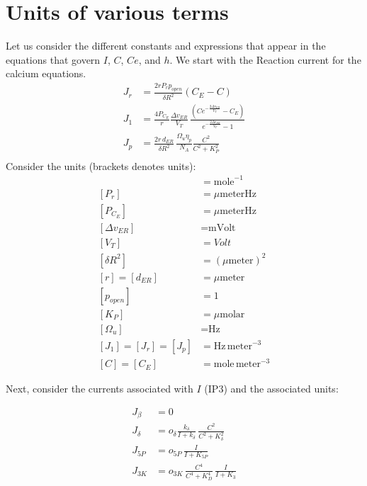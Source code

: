 \documentclass{article}
\begin{document}
\section{Units of various terms}
Let us consider the different constants and expressions that appear in the equations that govern $I$, $C$, $Ce$, and $h$. 
We start with the Reaction current for the calcium equations. 
\newpage
\def\dvER{\Delta{v}_{ER}}
\def\dER{d_{ER}}
\def\dRtwo{\delta R^2}
\def\VVT{{V_T}}
\def\meter{\text{meter}}
\def\Hz{\text{Hz}}
\def\molar{\text{molar}}
\def\mole{\text{mole}}
\begin{align}
J_r &= \frac{2 r P_r p_{open}}{\dRtwo}   (C_E-C)  \\ %
J_1 &= \frac{4 P_{C_E}}{r}\frac{\dvER}{\VVT} \, \frac{(C e^{- \frac{2\dvER}{\VVT}} - C_E)}{e^{-\frac{2\dvER}{\VVT}}-1} \\ %
J_p &= \frac{2 r\, d_{ER}}{\dRtwo}  \,\frac{\Omega_u\eta_p}{N_A}   \frac{C^2}{C^2 + K_P^2} \\ %
\end{align}
Consider the units (brackets denotes units): 
\begin{align}
[N_A] &= \mole^{-1} \\
[P_r] &= \mu \meter \Hz \\
[P_{C_E}] &= \mu \meter \Hz \\
[\dvER] &= \text{mVolt} \\
[\VVT] &= Volt \\
[\dRtwo] &= (\mu\meter)^2 \\
[r] = [\dER] &= \mu\meter \\
[p_{open}] &= 1 \\
[K_P] &= \mu \molar \\
[\Omega_u] &= \Hz \\
[J_1] = [J_r] = [J_p] &= \Hz \, \meter^{-3} \\
[C] = [C_E] &= \mole \, \meter^{-3} 
\end{align}

\newpage
Next, consider the currents associated with $I$ (IP3) and the associated units: 
\def\kdelta{k_\delta}
\def\Kdelta{K_\delta}
\def\odelta{o_\delta}
\def\KD{K_D}

\begin{align}
J_\beta  &= 0  \\
J_\delta &= \odelta \frac{\kdelta}{I+\kdelta} \, \frac{C^2}{C^2+\Kdelta^2} \\%
J_{5P}   &= o_{5P} \, \frac{I}{I+K_{5P}}   \\ %
J_{3K}   &=  o_{3K} \, \frac{C^4}{C^4+\KD^4} \, \frac{I}{I+K_3} %
\end{align}
\end{document}
